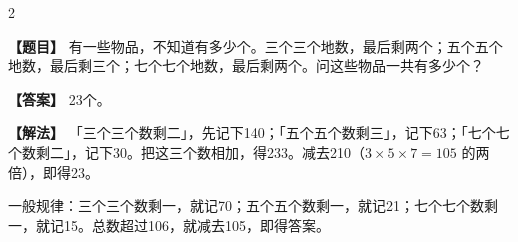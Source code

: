 \documentclass[11pt,a4paper]{article}
\begin{document}
\begin{paracol}{2}
\begin{tcolorbox}[colback=crtgold!8,colframe=crtgold,boxrule=1.5pt,
  left=10pt,right=10pt,top=8pt,bottom=8pt,arc=3mm]
\vspace{0.2cm}

\textbf{【题目】} 有一些物品，不知道有多少个。三个三个地数，最后剩两个；五个五个地数，最后剩三个；七个七个地数，最后剩两个。问这些物品一共有多少个？

\vspace{0.2cm}

\textbf{【答案】} 23个。

\vspace{0.2cm}

\textbf{【解法】} 「三个三个数剩二」，先记下140；「五个五个数剩三」，记下63；「七个七个数剩二」，记下30。把这三个数相加，得233。减去210（$3 \times 5 \times 7 = 105$ 的两倍），即得23。

一般规律：三个三个数剩一，就记70；五个五个数剩一，就记21；七个七个数剩一，就记15。总数超过106，就减去105，即得答案。
\end{tcolorbox}

\end{paracol}

\vspace{0.5cm}
\end{document}
